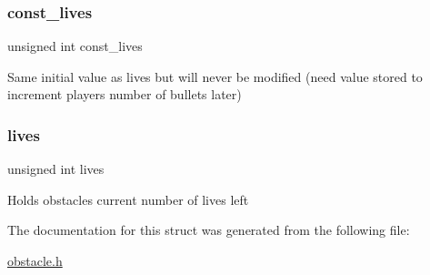 \subsubsection{\texorpdfstring{const\+\_\+lives}{const\_lives}}
{\footnotesize\ttfamily unsigned int const\+\_\+lives}

Same initial value as \textquotesingle{}lives\textquotesingle{} but will never be modified (need value stored to increment player\textquotesingle{}s number of bullets later) \hypertarget{struct_obstacle_a5b6f67c2402ab532f12e2422ddd2f5e4}{}\label{struct_obstacle_a5b6f67c2402ab532f12e2422ddd2f5e4} 
\subsubsection{\texorpdfstring{lives}{lives}}
{\footnotesize\ttfamily unsigned int lives}

Holds obstacle\textquotesingle{}s current number of lives left 

The documentation for this struct was generated from the following file\+:\begin{DoxyCompactItemize}
\item 
\hyperlink{obstacle_8h}{obstacle.\+h}\end{DoxyCompactItemize}
